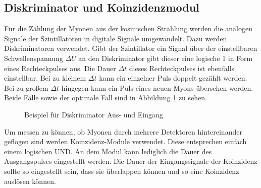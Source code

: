 \subsection{Diskriminator und Koinzidenzmodul}
Für die Zählung der Myonen aus der kosmischen Strahlung werden die analogen Signale der Szintillatoren in digitale Signale umgewandelt. Dazu werden Diskriminatoren verwendet. Gibt der Szintillator ein Signal über der einstellbaren Schwellenspannung $\Delta U$ an den Diskriminator gibt dieser eine logische 1 in Form eines Rechteckpulses aus. Die Dauer $\Delta t$ dieses Rechteckpulses ist ebenfalls einstellbar. Bei zu kleinem $\Delta t$ kann ein einzelner Puls doppelt gezählt werden. Bei zu großem $\Delta t$ hingegen kann ein Puls eines neuen Myons übersehen werden. Beide Fälle sowie der optimale Fall sind in Abbildung \ref{fig:diskriminator} zu sehen.

\begin{figure}[h]
  \centering
  \caption{Beispiel für Diskriminator Aus- und Eingang}
  \label{fig:diskriminator}
\end{figure}

Um messen zu können, ob Myonen durch mehrere Detektoren hintereinander geflogen sind werden Koinzidenz-Module verwendet. Diese entsprechen einfach einem logischen UND. An dem Modul kann lediglich die Dauer des Ausgangspulses eingestellt werden. Die Dauer der Eingangssignale der Koinzidenz sollte so eingestellt sein, dass sie überlappen können und so eine Koinzidenz auslösen können. 
